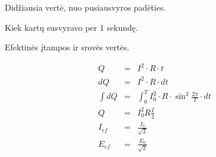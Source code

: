 \begin{defn}[Aplitudė]
  Didžiausia vertė, nuo pusiausvyros padėties.
\end{defn}

\begin{defn}
  Kiek kartų susvyravo per 1 sekundę.
\end{defn}

Efektinės įtampos ir srovės vertės.

\begin{align*}
  Q &=& I^{2} \cdot R \cdot t \\
  dQ &=& I^{2} \cdot R \cdot dt \\
  \int dQ &=&
    \int _{0} ^{T} I_{0}^{2} \cdot R 
    \cdot \sin^{2} \frac{2 \pi}{T} \cdot dt \\
  Q &=&  I^{2}_{0} R \frac{I}{2} \\
  I_{ef} &=&  \frac{I_{0}}{\sqrt{2}} \\
  E_{ef} &=&  \frac{E_{0}}{\sqrt{2}}
\end{align*}

